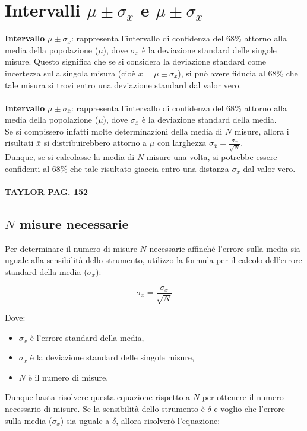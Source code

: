 \documentclass{article}
\begin{document}
\section{Intervalli $\mu \pm \sigma_x$ e $\mu \pm \sigma_{\bar{x}}$} 
\textbf{Intervallo} $\mu \pm \sigma_x$: rappresenta l'intervallo di confidenza del 68\% attorno alla media della popolazione ($\mu$), dove $\sigma_x$ è la deviazione standard delle singole misure. Questo significa che se si considera la deviazione standard come incertezza sulla singola misura (cioè $x = \mu \pm \sigma_x$), si può avere fiducia al 68\% che tale misura si trovi entro una deviazione standard dal valor vero.
\\\\ \noindent\textbf{Intervallo} $\mu \pm \sigma_{\bar{x}}$: rappresenta l'intervallo di confidenza del 68\% attorno alla media della popolazione ($\mu$), dove $\sigma_{\bar{x}}$ è la deviazione standard della media.
\\Se si compissero infatti molte determinazioni della media di $N$ misure, allora i risultati $\bar{x}$ si distribuirebbero attorno a $\mu$ con larghezza $\sigma_{\bar{x}} =  \frac{\sigma_x}{\sqrt{N}} $.
\\ Dunque, se si calcolasse la media di $N$ misure una volta, si potrebbe essere confidenti al 68\% che tale risultato giaccia entro una distanza $ \sigma_{\bar{x}}$ dal valor vero.
\\\\ \textbf{TAYLOR PAG. 152}

\subsection{$N$ misure necessarie}
Per determinare il numero di misure $N$ necessarie affinché l'errore sulla media sia uguale alla sensibilità dello strumento, utilizzo la formula per il calcolo dell'errore standard della media ($\sigma_{\bar{x}}$):

\[\sigma_{\bar{x}} = \frac{\sigma_x}{\sqrt{N}}\]

\noindent Dove:
\begin{itemize}
  \item $\sigma_{\bar{x}}$ è l'errore standard della media,
  \item $\sigma_x$ è la deviazione standard delle singole misure,
  \item $N$ è il numero di misure.
\end{itemize}

\noindent Dunque basta risolvere questa equazione rispetto a $N$ per ottenere il numero necessario di misure. Se la sensibilità dello strumento è $\delta$ e voglio che l'errore sulla media ($\sigma_{\bar{x}}$) sia uguale a $\delta$, allora risolverò l'equazione:
\end{document}
